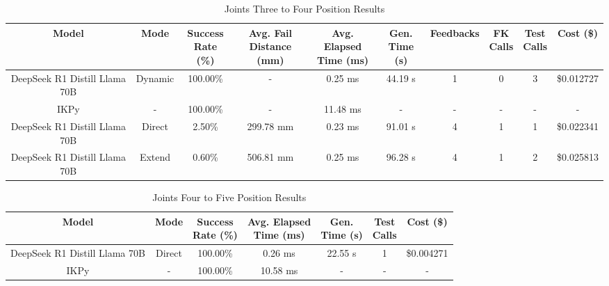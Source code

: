 \begin{landscape}
\begin{table}[H]
\tiny
\renewcommand{\arraystretch}{1.2}
\caption{Joints Three to Four Position Results}
\begin{center}
\begin{tabular}{|c|c|c|c|c|c|c|c|c|c|}
    \hline
    \textbf{Model} & 
    \textbf{Mode} & 
    \makecell{\textbf{Success}\\\textbf{Rate (\%)}} &
    \makecell{\textbf{Avg. Fail}\\\textbf{Distance (mm)}} &
    \makecell{\textbf{Avg. Elapsed}\\\textbf{Time (ms)}} &
    \makecell{\textbf{Gen.}\\\textbf{Time (s)}} &
    \textbf{Feedbacks} &
    \makecell{\textbf{FK}\\\textbf{Calls}} &
    \makecell{\textbf{Test}\\\textbf{Calls}} &
    \textbf{Cost (\$)} \\
    \hline
    DeepSeek R1 Distill Llama 70B & Dynamic & 100.00\% & - & 0.25 ms & 44.19 s & 1 & 0 & 3 & \$0.012727 \\
    \hline
    IKPy & - & 100.00\% & - & 11.48 ms & - & - & - & - & - \\
    \hline
    DeepSeek R1 Distill Llama 70B & Direct & 2.50\% & 299.78 mm & 0.23 ms & 91.01 s & 4 & 1 & 1 & \$0.022341 \\
    \hline
    DeepSeek R1 Distill Llama 70B & Extend & 0.60\% & 506.81 mm & 0.25 ms & 96.28 s & 4 & 1 & 2 & \$0.025813 \\
    \hline
\end{tabular}
\label{Results-Position-3-4}
\end{center}
\end{table}

\begin{table}[H]
\tiny
\renewcommand{\arraystretch}{1.2}
\caption{Joints Four to Five Position Results}
\begin{center}
\begin{tabular}{|c|c|c|c|c|c|c|}
    \hline
    \textbf{Model} & 
    \textbf{Mode} & 
    \makecell{\textbf{Success}\\\textbf{Rate (\%)}} &
    \makecell{\textbf{Avg. Elapsed}\\\textbf{Time (ms)}} &
    \makecell{\textbf{Gen.}\\\textbf{Time (s)}} &
    \makecell{\textbf{Test}\\\textbf{Calls}} &
    \textbf{Cost (\$)} \\
    \hline
    DeepSeek R1 Distill Llama 70B & Direct & 100.00\% & 0.26 ms & 22.55 s & 1 & \$0.004271 \\
    \hline
    IKPy & - & 100.00\% & 10.58 ms & - & - & - \\
    \hline
\end{tabular}
\label{Results-Position-4-5}
\end{center}
\end{table}


\end{landscape}

